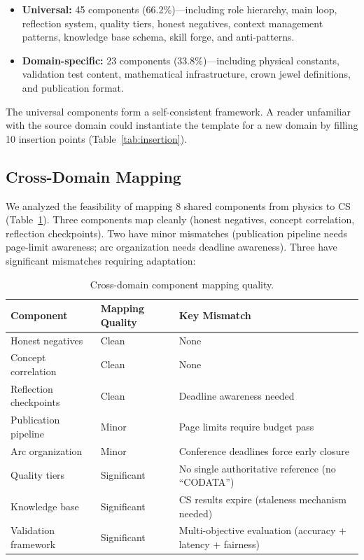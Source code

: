 \documentclass[11pt,a4paper]{article}
\begin{document}
\begin{itemize}[nosep]
    \item \textbf{Universal:} 45 components (66.2\%)---including role hierarchy,
          main loop, reflection system, quality tiers, honest negatives, context
          management patterns, knowledge base schema, skill forge, and anti-patterns.
    \item \textbf{Domain-specific:} 23 components (33.8\%)---including physical
          constants, validation test content, mathematical infrastructure, crown
          jewel definitions, and publication format.
\end{itemize}

The universal components form a self-consistent framework. A reader unfamiliar
with the source domain could instantiate the template for a new domain by filling
10 insertion points (Table~\ref{tab:insertion}).

\subsection{Cross-Domain Mapping}

We analyzed the feasibility of mapping 8 shared components from physics to CS
(Table~\ref{tab:mapping}). Three components map cleanly (honest negatives, concept
correlation, reflection checkpoints). Two have minor mismatches (publication pipeline
needs page-limit awareness; arc organization needs deadline awareness). Three have
significant mismatches requiring adaptation:

\begin{table}[t]
\centering
\caption{Cross-domain component mapping quality.}
\label{tab:mapping}
\small
\begin{tabular}{@{}lll@{}}
\toprule
Component & Mapping Quality & Key Mismatch \\
\midrule
Honest negatives       & Clean       & None \\
Concept correlation    & Clean       & None \\
Reflection checkpoints & Clean       & Deadline awareness needed \\
Publication pipeline   & Minor       & Page limits require budget pass \\
Arc organization       & Minor       & Conference deadlines force early closure \\
Quality tiers          & Significant & No single authoritative reference (no ``CODATA'') \\
Knowledge base         & Significant & CS results expire (staleness mechanism needed) \\
Validation framework   & Significant & Multi-objective evaluation (accuracy + latency + fairness) \\
\bottomrule
\end{tabular}
\end{table}
\end{document}
